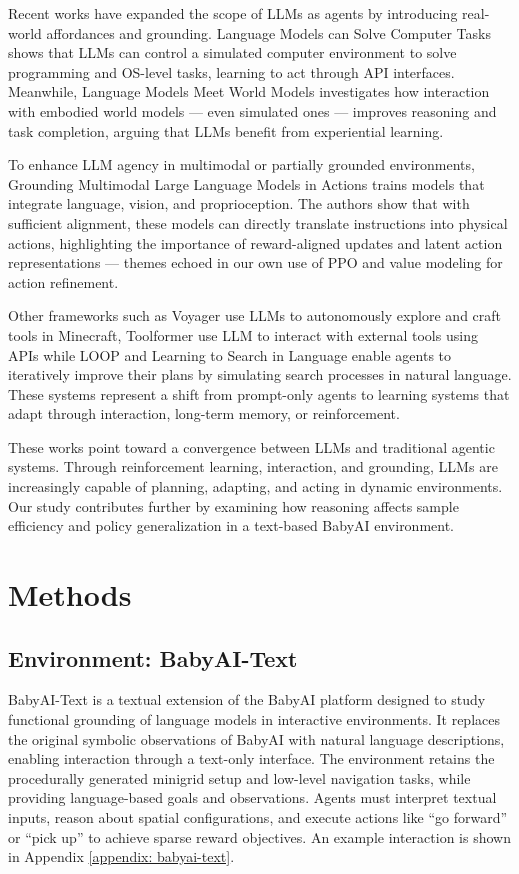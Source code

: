 \documentclass[11pt,a4paper]{article}
\begin{document}
Recent works have expanded the scope of LLMs as agents by introducing real-world affordances and grounding. Language Models can Solve Computer Tasks \cite{kim2023language} shows that LLMs can control a simulated computer environment to solve programming and OS-level tasks, learning to act through API interfaces. Meanwhile, Language Models Meet World Models \cite{xiang2023language} investigates how interaction with embodied world models — even simulated ones — improves reasoning and task completion, arguing that LLMs benefit from experiential learning.

To enhance LLM agency in multimodal or partially grounded environments, Grounding Multimodal Large Language Models in Actions \cite{szot2024grounding} trains models that integrate language, vision, and proprioception. The authors show that with sufficient alignment, these models can directly translate instructions into physical actions, highlighting the importance of reward-aligned updates and latent action representations — themes echoed in our own use of PPO and value modeling for action refinement.

Other frameworks such as Voyager \cite{wang2023voyager} use LLMs to autonomously explore and craft tools in Minecraft, Toolformer \cite{schick2023toolformer} use LLM to interact with external tools using APIs while LOOP \cite{chen2025reinforcement} and Learning to Search in Language \cite{gandhi2024stream} enable agents to iteratively improve their plans by simulating search processes in natural language. These systems represent a shift from prompt-only agents to learning systems that adapt through interaction, long-term memory, or reinforcement.

These works point toward a convergence between LLMs and traditional agentic systems. 
Through reinforcement learning, interaction, and grounding, 
LLMs are increasingly capable of planning, adapting, and acting in dynamic environments. 
Our study contributes further by examining how reasoning affects sample efficiency and policy generalization in a text-based BabyAI environment.

\section{Methods}

\subsection{Environment: BabyAI-Text}
BabyAI-Text \cite{carta2023grounding} is a textual extension of the BabyAI platform \cite{chevalier2018babyai} designed to study functional grounding of language models in interactive environments. 
It replaces the original symbolic observations of BabyAI with natural language descriptions, enabling interaction through a text-only interface. 
The environment retains the procedurally generated minigrid setup and low-level navigation tasks, while providing language-based goals and observations. 
Agents must interpret textual inputs, reason about spatial configurations, and execute actions like ``go forward'' or ``pick up'' to achieve sparse reward objectives.  
An example interaction is shown in Appendix \ref{appendix: babyai-text}.
\end{document}
